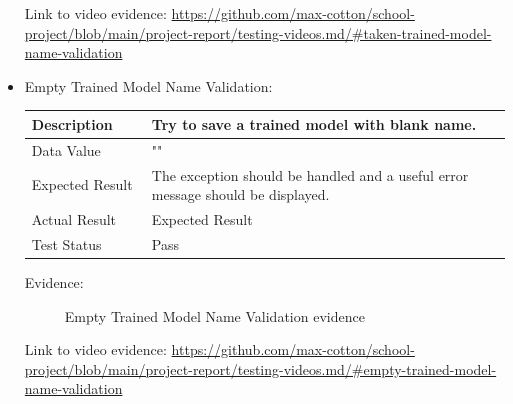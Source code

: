 \documentclass[./project-report/src/latex/project-report.tex]{subfiles}
\begin{document}
\begin{itemize}
		Link to video evidence: \url{https://github.com/max-cotton/school-project/blob/main/project-report/testing-videos.md/#taken-trained-model-name-validation}

	\pagebreak
	
	\item Empty Trained Model Name Validation: \newline\newline
		\begin{tabular}{|p{0.25\linewidth}|p{0.75\linewidth}|}
			\hline
			Description & Try to save a trained model with blank name. \\
			\hline
			Data Value & "" \\
			\hline
			Expected Result & The exception should be handled and a useful error message should be displayed. \\
			\hline
			Actual Result & Expected Result \\
			\hline
			Test Status & Pass \\
			\hline
		\end{tabular}

		\vspace{5mm}

		Evidence:
		\begin{figure}[h!]
		\centering
		\caption{Empty Trained Model Name Validation evidence}
		\end{figure}

		Link to video evidence: \url{https://github.com/max-cotton/school-project/blob/main/project-report/testing-videos.md/#empty-trained-model-name-validation}


\end{itemize}
\end{document}
